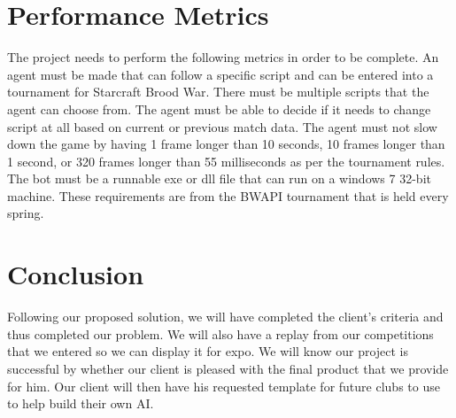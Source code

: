 \documentclass[10pt,letterpaper,onecolumn,draftclsnofoot]{IEEEtran}
\begin{document}
\section{Performance Metrics}
The project needs to perform the following metrics in order to be complete. An agent must be made that can follow a specific script and can be entered into a tournament for Starcraft Brood War. There must be multiple scripts that the agent can choose from. The agent must be able to decide if it needs to change script at all based on current or previous match data. The agent must not slow down the game by having 1 frame longer than 10 seconds, 10 frames longer than 1 second, or 320 frames longer than 55 milliseconds as per the tournament rules. The bot must be a runnable exe or dll file that can run on a windows 7 32-bit machine. These requirements are from the BWAPI tournament that is held every spring.

\section{Conclusion}
Following our proposed solution, we will have completed the client's criteria and thus completed our problem. We will also have a replay from our competitions that we entered so we can display it for expo. We will know our project is successful by whether our client is pleased with the final product that we provide for him. Our client will then have his requested template for future clubs to use to help build their own AI.
\end{document}
